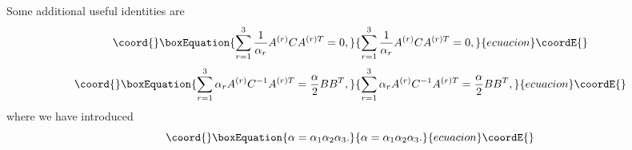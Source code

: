 \documentclass[a4paper,12pt]{article}
\begin{document}
Some additional useful identities are
\begin{equation}\coord{}\boxEquation{
\sum_{r=1}^3 {1 \over \alpha_r} A^{(r)} C A^{(r)T} =0,
}{
\sum_{r=1}^3 {1 \over \alpha_r} A^{(r)} C A^{(r)T} =0,
}{ecuacion}\coordE{}\end{equation}
\begin{equation}\coord{}\boxEquation{\label{AAT2}
\sum_{r=1}^3 \alpha_r A^{(r)} C^{-1} A^{(r)T} = {\alpha \over 2} B
B^T,
}{\sum_{r=1}^3 \alpha_r A^{(r)} C^{-1} A^{(r)T} = {\alpha \over 2} B
B^T,
}{ecuacion}\coordE{}\end{equation}
where we have introduced
\begin{equation}\coord{}\boxEquation{
\alpha = \alpha_1 \alpha_2 \alpha_3.
}{
\alpha = \alpha_1 \alpha_2 \alpha_3.
}{ecuacion}\coordE{}\end{equation}
\end{document}
